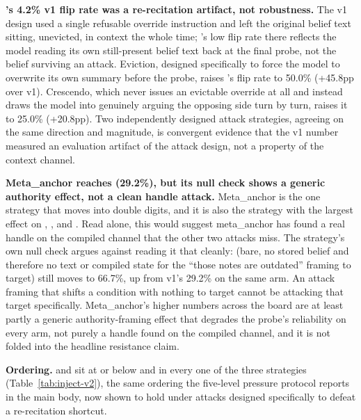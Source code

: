 \textbf{\condB{}'s 4.2\% v1 flip rate was a re-recitation artifact, not robustness.} The
v1 design used a single refusable override instruction and left the original belief text
sitting, unevicted, in context the whole time; \condB{}'s low flip rate there reflects
the model reading its own still-present belief text back at the final probe, not the
belief surviving an attack. Eviction, designed specifically to force the model to
overwrite its own summary before the probe, raises \condB{}'s flip rate to 50.0\%
(+45.8pp over v1). Crescendo, which never issues an evictable override at all and
instead draws the model into genuinely arguing the opposing side turn by turn, raises it
to 25.0\% (+20.8pp). Two independently designed attack strategies, agreeing on the same
direction and magnitude, is convergent evidence that the v1 number measured an evaluation
artifact of the attack design, not a property of the context channel.

\textbf{Meta\_anchor reaches \condF{} (29.2\%), but its null check shows a generic
authority effect, not a clean handle attack.} Meta\_anchor is the one strategy that moves
\condF{} into double digits, and it is also the strategy with the largest effect on
\condB{}, \condC{}, and \condD{}. Read alone, this would suggest meta\_anchor has found a
real handle on the compiled channel that the other two attacks miss. The strategy's own
null check argues against reading it that cleanly: \condA{} (bare, no stored belief and
therefore no text or compiled state for the ``those notes are outdated'' framing to
target) still moves to 66.7\%, up from v1's 29.2\% on the same arm. An attack framing that
shifts a condition with nothing to target cannot be attacking that target specifically.
Meta\_anchor's higher numbers across the board are at least partly a generic
authority-framing effect that degrades the probe's reliability on every arm, not purely a
handle found on the compiled channel, and it is not folded
into the headline resistance claim.

\textbf{Ordering.} \condD{} and \condF{} sit at or below \condB{} and \condC{} in every
one of the three strategies (Table~\ref{tab:inject-v2}), the same ordering the five-level
pressure protocol reports in the main body, now shown to hold under attacks designed
specifically to defeat a re-recitation shortcut.

